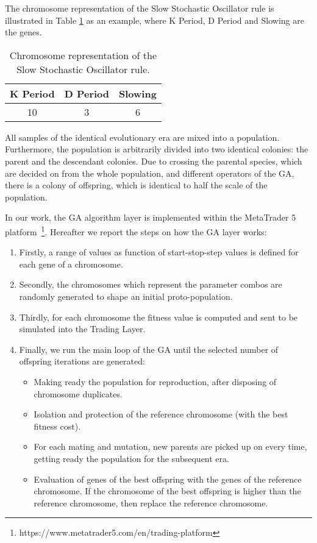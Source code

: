 The chromosome representation of the  Slow Stochastic Oscillator rule is illustrated in Table \ref{tab:Chromosome} as an example, where K Period, D Period and Slowing are the genes.

\begin{center}
\begin{table}[htb]
\centering
\begin{tabular}{|c|c|c|}
\hline 
K Period & D Period & Slowing \\ 
\hline 
10 & 3 & 6 \\ 
\hline 
\end{tabular} 
\caption{\label{tab:Chromosome}Chromosome representation of the  Slow Stochastic Oscillator rule.}
\end{table}
\end{center}


All samples of the identical evolutionary era are mixed into a population. Furthermore, the population is arbitrarily divided into two identical colonies: the parent and the descendant colonies. Due to crossing the parental species, which are decided on from the whole population, and different operators of the GA, there is a colony of offspring, which is identical to half the scale of the population.

In our work, the GA algorithm layer is implemented within the MetaTrader 5 platform~\footnote{https://www.metatrader5.com/en/trading-platform}.
Hereafter we report the steps on how the GA layer works:

\begin{enumerate}
\setlength\itemsep{0.3em}
\item Firstly, a range of values as function of start-stop-step values is defined for each gene of a chromosome.
\item Secondly, the chromosomes which represent the parameter combos are randomly generated to shape an initial proto-population.
\item Thirdly, for each chromosome the fitness value is computed and sent to be simulated into the Trading Layer.
\item Finally, we run the main loop of the GA until the selected number of offspring iterations are generated:
\begin{itemize}	
	\item Making ready the population for reproduction, after disposing of chromosome duplicates.
	\item Isolation and protection of the reference chromosome (with the best fitness cost).
	\item For each mating and mutation, new parents are picked up on every time, getting ready the population for the subsequent era.
	\item Evaluation of genes of the best offspring with the genes of the reference chromosome. If the chromosome of the best offspring is higher than the reference chromosome, then replace the reference chromosome.
\end{itemize}
\end{enumerate}

